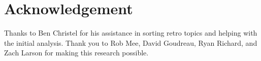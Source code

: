 
\section*{Acknowledgement}
Thanks to Ben Christel for his assistance in sorting retro topics and helping with the initial analysis. Thank you to Rob Mee, David Goudreau, Ryan Richard, and Zach Larson for making this research possible.


